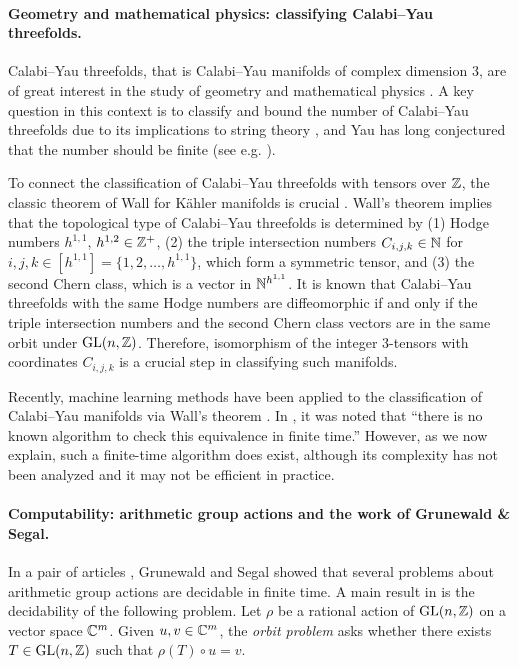 \paragraph{Geometry and mathematical physics: classifying Calabi--Yau threefolds.} Calabi--Yau threefolds, that is Calabi--Yau manifolds of complex dimension 3, %
are of great interest in the study of geometry and mathematical physics \cite{Yau78,Calabi_Yau-1,Calabi_Yau-2,Calabi_Yau-3}. A key question in this context is to classify and bound the number of Calabi--Yau threefolds due to its implications to string theory \cite{Rei87,CY-count,CCFHL24}, and Yau has long conjectured that the number should be finite (see e.g. \cite{HYY24}). 

To connect the classification of Calabi--Yau threefolds with tensors over $\mathbb{Z}$, the classic theorem of Wall for K\"ahler manifolds is crucial \cite{Wall66}. Wall's theorem implies that the topological type of Calabi--Yau threefolds is determined by (1) Hodge numbers $h^{1,1}$, $h^{1,2}\in \mathbb{Z}^+$, (2) the triple intersection numbers $C_{i,j,k}\in\mathbb{N}$ for $i, j, k\in [h^{1,1}] = \{1,2,\dotsc,h^{1,1}\}$, which form a symmetric tensor, and (3) the second Chern class, which is a vector in $\mathbb{N}^{h^{1,1}}$. It is known \cite{CY-count,CCFHL24} that Calabi--Yau threefolds with the same Hodge numbers are diffeomorphic if and only if the triple intersection numbers and the second Chern class vectors are in the same orbit under $\mathrm{GL}(n, \mathbb{Z})$. Therefore, isomorphism of the integer 3-tensors with coordinates $C_{i,j,k}$ is a crucial step in classifying such manifolds.




Recently, machine learning methods have been applied to the classification of Calabi--Yau manifolds via Wall's theorem \cite{JTT22,HYY24}. In \cite{JTT22}, it was noted that ``there is no known algorithm to check this equivalence in finite time.'' However, as we now explain, such a finite-time algorithm does exist, although its complexity has not been analyzed and it may not be efficient in practice. %



\paragraph{Computability: arithmetic group actions and the work of Grunewald \& Segal.} In a pair of articles \cite{GS80-1,GS80-2}, Grunewald and Segal showed that several problems about arithmetic group actions are decidable in finite time. A main result in \cite{GS80-1} is the decidability of the following problem. Let $\rho$ be a rational action of $\mathrm{GL}(n, \mathbb{Z})$ on a vector space $\mathbb{C}^m$. Given $u, v\in \mathbb{C}^m$, the \emph{orbit problem} asks whether there exists $T\in \mathrm{GL}(n, \mathbb{Z})$ such that $\rho(T)\circ u=v$. 



